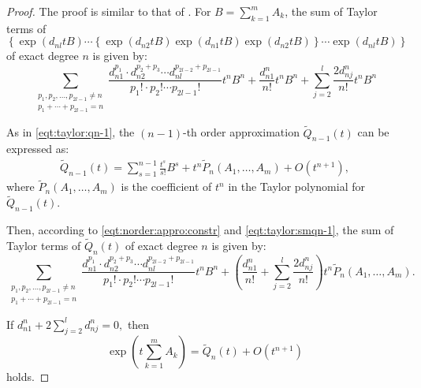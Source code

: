 \documentclass{article}
\theoremstyle{plain} %
\numberwithin{equation}{section}
\begin{document}
\begin{proof}
The proof is similar to that of . For $\displaystyle B=\sum_{k=1}^m A_k$, the sum of Taylor terms of \[ \left\{\exp\left(d_{nl} t B\right)\cdots\left\{\exp\left(d_{n2} tB\right)\exp\left(d_{n1} tB\right)\exp\left(d_{n2} tB\right)\right\}\cdots \exp\left(d_{nl} tB\right)\right\}\] of exact degree $n$ is given by:
\[
\sum_{\substack{p_1, p_2, \dots, p_{2l-1}\neq n \\ p_1 + \cdots + p_{2l-1} = n}} \frac{d_{n1}^{p_1} \cdot d_{n2}^{p_2+p_3}\cdots d_{nl}^{p_{2l-2}+p_{2l-1}}}{p_1! \cdot p_2!\cdots p_{2l-1}!}t^n B^n+\frac{d_{n1}^n}{n!}t^n B^n+\sum_{j=2}^l \frac{2d_{nj}^n}{n!}t^n B^n 
\]

As in \cref{eqt:taylor:qn-1}, 
the $(n-1)$-th order approximation $\widetilde{Q}_{n-1}(t)$ can be expressed as:
\begin{align}\label{eqt:taylor:smqn-1}
\widetilde{Q}_{n-1}(t) = \sum_{s=1}^{n-1} \frac{t^s}{s!} B^s + t^n \widetilde{P}_n(A_1, \dots, A_m) + O(t^{n+1}),	
\end{align}
where $\widetilde{P}_n(A_1, \dots, A_m)$ is the coefficient of $t^n$ in the Taylor polynomial for $\widetilde{Q}_{n-1}(t)$.

Then, according to \cref{eqt:norder:appro:constr} and \cref{eqt:taylor:smqn-1},   the sum of Taylor terms of $\displaystyle \widetilde{Q}_n(t)$ of exact degree $n$ is given by:
\[
 \sum_{\substack{p_1, p_2, \dots, p_{2l-1} \neq n \\ p_1 + \cdots + p_{2l-1} = n}} \frac{d_{n1}^{p_1} \cdot d_{n2}^{p_2+p_3}\cdots d_{nl}^{p_{2l-2}+p_{2l-1}}}{p_1! \cdot p_2!\cdots p_{2l-1}!} t^n B^n +\left(\frac{d_{n1}^n}{n!}+\sum_{j=2}^l \frac{2d_{nj}^n}{n!}\right)t^n \widetilde{P}_n(A_1,\dots, A_m).
\]


If $\displaystyle d_{n1}^n+2\sum_{j=2}^l d_{nj}^n=0,$ then \[
    \exp\left(t\sum_{k=1}^m A_k\right) = \widetilde{Q}_n(t) + O(t^{n+1})
\]
holds.
\end{proof}
\end{document}
